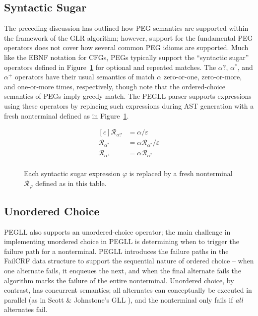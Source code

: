 \documentclass{article}
\newcommand{\Rule}{\mathcal{R}}
\begin{document}
\subsection{Syntactic Sugar} \label{syntax-sec}

The preceding discussion has outlined how PEG semantics are supported within the framework of the GLR algorithm; however, support for the fundamental PEG operators does not cover how several common PEG idioms are supported. 
Much like the EBNF notation for CFGs, PEGs typically support the ``syntactic sugar'' operators defined in Figure~\ref{sugar-fig} for optional and repeated matches. 
The $\alpha?$, $\alpha^*$, and $\alpha^+$ operators have their usual semantics of match $\alpha$ zero-or-one, zero-or-more, and one-or-more times, respectively, though note that the ordered-choice semantics of PEGs imply greedy match.
The PEGLL parser supports expressions using these operators by replacing such expressions during AST generation with a fresh nonterminal defined as in Figure~\ref{sugar-fig}.

\begin{figure}
	\centering
	\begin{equation*}
	\begin{aligned}[c]
	\Rule_{\alpha?} & = \alpha / \varepsilon \\
	\Rule_{\alpha^*} & = \alpha \Rule_{\alpha^*} / \varepsilon \\
    \Rule_{\alpha^+} & = \alpha \Rule_{\alpha^*} \\
	\end{aligned}
	\end{equation*}
	\caption[Syntactic sugar definitions]{Each syntactic sugar expression $\varphi$ is replaced by a fresh nonterminal $\Rule_\varphi$ defined as in this table.} \label{sugar-fig}
\end{figure}

\subsection{Unordered Choice}

PEGLL also supports an unordered-choice operator; the main challenge in implementing unordered choice in PEGLL is determining when to trigger the failure path for a nonterminal.
PEGLL introduces the failure paths in the FailCRF data structure to support the sequential nature of ordered choice -- when one alternate fails, it enqueues the next, and when the final alternate fails the algorithm marks the failure of the entire nonterminal. 
Unordered choice, by contrast, has concurrent semantics; all alternates can conceptually be executed in parallel (as in Scott \& Johnstone's GLL \cite{SJ10,SJ16}), and the nonterminal only fails if \emph{all} alternates fail. 
\end{document}
